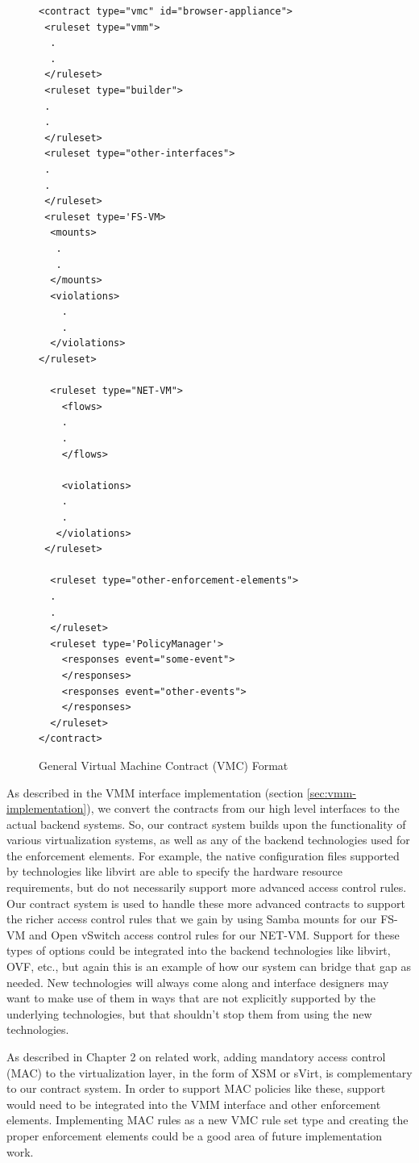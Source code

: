 \begin{figure}[tbp]
\caption{General Virtual Machine Contract (VMC) Format}
\label{lst:vmc_general}

\begin{lstlisting}
<contract type="vmc" id="browser-appliance">
 <ruleset type="vmm">
  .
  .
 </ruleset>
 <ruleset type="builder">
 .
 .
 </ruleset>
 <ruleset type="other-interfaces">
 .
 .
 </ruleset>
 <ruleset type='FS-VM>
  <mounts>
   .
   .
  </mounts>
  <violations>
    .
    .
  </violations>
</ruleset>

  <ruleset type="NET-VM">
    <flows>
    .
    .
    </flows>

    <violations>
    .
    . 
   </violations>
 </ruleset>

  <ruleset type="other-enforcement-elements">
  .
  .
  </ruleset>
  <ruleset type='PolicyManager'>
    <responses event="some-event">
    </responses>
    <responses event="other-events">
    </responses>
  </ruleset>
</contract>
\end{lstlisting}
\end{figure}

As described in the VMM interface implementation (section \ref{sec:vmm-implementation}), we convert the contracts from our high level interfaces to the actual backend systems. So, our contract system builds upon the functionality of various virtualization systems, as well as any of the backend technologies used for the enforcement elements. For example, the native configuration files supported by technologies like libvirt are able to specify the hardware resource requirements, but do not necessarily support more advanced access control rules. Our contract system is used to handle these more advanced contracts to support the richer access control rules that we gain by using Samba mounts for our FS-VM and Open vSwitch access control rules for our NET-VM. Support for these types of options could be integrated into the backend technologies like libvirt, OVF, etc., but again this is an example of how our system can bridge that gap as needed. New technologies will always come along and interface designers may want to make use of them in ways that are not explicitly supported by the underlying technologies, but that shouldn't stop them from using the new technologies.

As described in Chapter 2 on related work, adding mandatory access control (MAC) to the virtualization layer, in the form of XSM\cite{xsm_xen_summit_3rd} or sVirt\cite{sVirt_website}, is complementary to our contract system. In order to support MAC policies like these, support would need to be integrated into the VMM interface and other enforcement elements. Implementing MAC rules as a new VMC rule set type and creating the proper enforcement elements could be a good area of future implementation work.

